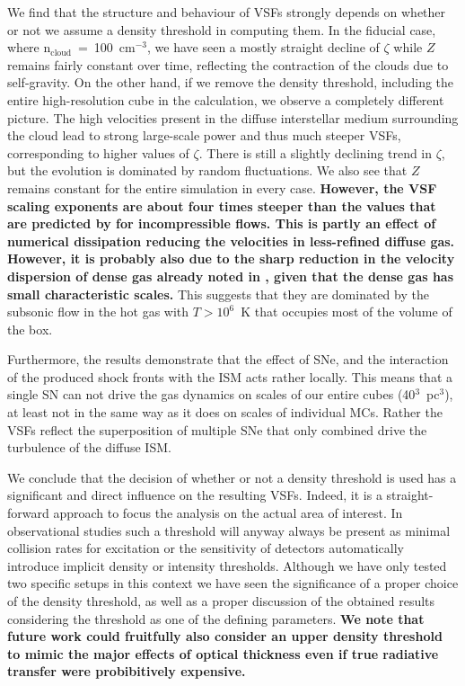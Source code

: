 We find that the structure and behaviour of VSFs strongly depends on whether or not we assume a density threshold in computing them.
In the fiducial case, where n$_\mathrm{cloud}$~=~100~cm$^{-3}$, we have seen a mostly straight decline of $\zeta$ while $Z$ remains fairly constant over time, reflecting the contraction of the clouds due to self-gravity.
On the other hand, if we remove the density threshold, including the entire high-resolution cube in the calculation, we observe a completely different picture.
The high velocities present in the diffuse interstellar medium surrounding the cloud lead to strong large-scale power and thus much steeper VSFs, corresponding to higher values of $\zeta$. 
There is still a slightly declining trend in $\zeta$, but the evolution is dominated by random fluctuations.
We also see that $Z$ remains constant for the entire simulation in every case.
\textbf{
    However, the VSF scaling exponents are about four times steeper than the values that are predicted by \citep{Boldyrev2002} for incompressible flows.
    This is partly an effect of numerical dissipation reducing the velocities in less-refined diffuse gas.
    However, it is probably also due to the sharp reduction in the velocity dispersion of dense gas already noted in , given that the dense gas has small characteristic scales.
}
This suggests that they are dominated by the subsonic flow in the hot gas with $T > 10^6$~K that occupies most of the volume of the box.

Furthermore, the results demonstrate that the effect of SNe, and the interaction of the produced shock fronts with the ISM acts rather locally. 
This means that a single SN can not drive the gas dynamics on scales of our entire cubes (40$^3$~pc$^3$), at least not in the same way as it does on scales of individual MCs.
Rather the VSFs reflect the superposition of multiple SNe that only combined drive the turbulence of the diffuse ISM.

We conclude that the decision of whether or not a density threshold is used has a significant and direct influence on the resulting VSFs.
Indeed, it is a straight-forward approach to focus the analysis on the actual area of interest.
In observational studies such a threshold will anyway always be present as minimal collision rates for excitation or the sensitivity of detectors automatically introduce implicit density or intensity thresholds. 
Although we have only tested two specific setups in this context we have seen the significance of a proper choice of the density threshold, as well as a proper discussion of the obtained results considering the threshold as one of the defining parameters.
\textbf{
    We note that future work could fruitfully also consider an upper density threshold to mimic the major effects of optical thickness even if true radiative transfer were probibitively expensive.
}

